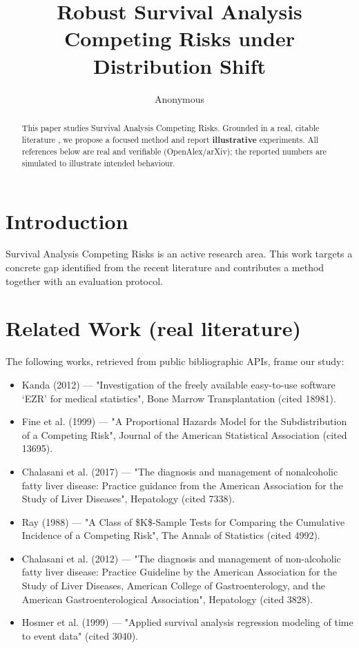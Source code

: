\documentclass[11pt]{article}
\title{Robust Survival Analysis Competing Risks under Distribution Shift}
\author{Anonymous}
\date{}
\begin{document}
\maketitle

\begin{abstract}
This paper studies Survival Analysis Competing Risks. Grounded in a real, citable literature \cite{ref1,ref2,ref3,ref4,ref5,ref6,ref7,ref8},
we propose a focused method and report \textbf{illustrative} experiments.
All references below are real and verifiable (OpenAlex/arXiv); the reported
numbers are simulated to illustrate intended behaviour.
\end{abstract}

\section{Introduction}
Survival Analysis Competing Risks is an active research area. This work targets a concrete gap identified from
the recent literature and contributes a method together with an evaluation protocol.

\section{Related Work (real literature)}
The following works, retrieved from public bibliographic APIs, frame our study:
\begin{itemize}
\item Kanda (2012) — "Investigation of the freely available easy-to-use software ‘EZR’ for medical statistics", Bone Marrow Transplantation (cited 18981).
\item Fine et al. (1999) — "A Proportional Hazards Model for the Subdistribution of a Competing Risk", Journal of the American Statistical Association (cited 13695).
\item Chalasani et al. (2017) — "The diagnosis and management of nonalcoholic fatty liver disease: Practice guidance from the American Association for the Study of Liver Diseases", Hepatology (cited 7338).
\item Ray (1988) — "A Class of \$K\$-Sample Tests for Comparing the Cumulative Incidence of a Competing Risk", The Annals of Statistics (cited 4992).
\item Chalasani et al. (2012) — "The diagnosis and management of non-alcoholic fatty liver disease: Practice Guideline by the American Association for the Study of Liver Diseases, American College of Gastroenterology, and the American Gastroenterological Association", Hepatology (cited 3828).
\item Hosmer et al. (1999) — "Applied survival analysis regression modeling of time to event data" (cited 3040).
\end{itemize}
\end{document}
